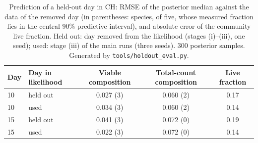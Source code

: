\documentclass[11pt,a4paper]{article}
\begin{document}
\begin{table}[h]
\centering
\caption{Prediction of a held-out day in CH: RMSE of the posterior median against the data of the removed day (in parentheses: species, of five, whose measured fraction lies in the central 90\% predictive interval), and absolute error of the community live fraction. Held out: day removed from the likelihood (stages (i)--(iii), one seed); used: stage (iii) of the main runs (three seeds). 300 posterior samples. Generated by \texttt{tools/holdout\_eval.py}.}
\label{tab:S_holdout}
\small
\begin{tabular}{llccc}
\toprule
Day & Day in likelihood & Viable composition & Total-count composition & Live fraction\\
\midrule
10 & held out & 0.027 (3) & 0.060 (2) & 0.17\\
10 & used     & 0.034 (3) & 0.060 (2) & 0.14\\
15 & held out & 0.041 (3) & 0.072 (0) & 0.19\\
15 & used     & 0.022 (3) & 0.072 (0) & 0.14\\
\bottomrule
\end{tabular}
\end{table}



\end{document}
